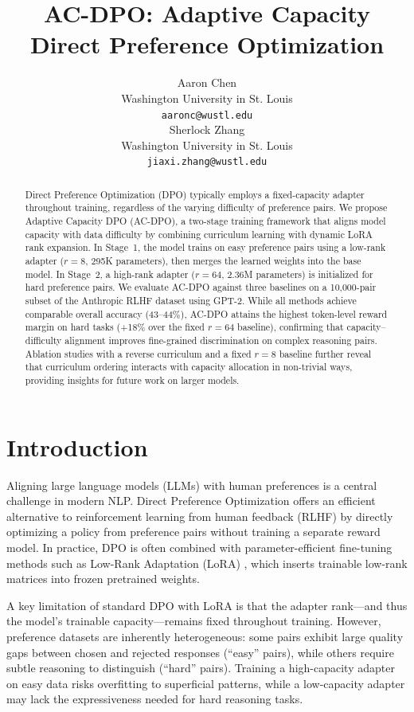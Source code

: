 \documentclass{article}
\title{AC-DPO: Adaptive Capacity Direct Preference Optimization}
\author{
  Aaron Chen \\
  Washington University in St. Louis \\
  \texttt{aaronc@wustl.edu} \\
  \And
  Sherlock Zhang \\
  Washington University in St. Louis \\
  \texttt{jiaxi.zhang@wustl.edu} \\
}
\begin{document}
\maketitle

\begin{abstract}
Direct Preference Optimization (DPO) typically employs a fixed-capacity adapter throughout training, regardless of the varying difficulty of preference pairs. We propose Adaptive Capacity DPO (AC-DPO), a two-stage training framework that aligns model capacity with data difficulty by combining curriculum learning with dynamic LoRA rank expansion. In Stage~1, the model trains on easy preference pairs using a low-rank adapter ($r{=}8$, 295K parameters), then merges the learned weights into the base model. In Stage~2, a high-rank adapter ($r{=}64$, 2.36M parameters) is initialized for hard preference pairs. We evaluate AC-DPO against three baselines on a 10,000-pair subset of the Anthropic RLHF dataset using GPT-2. While all methods achieve comparable overall accuracy (43--44\%), AC-DPO attains the highest token-level reward margin on hard tasks (+18\% over the fixed $r{=}64$ baseline), confirming that capacity--difficulty alignment improves fine-grained discrimination on complex reasoning pairs. Ablation studies with a reverse curriculum and a fixed $r{=}8$ baseline further reveal that curriculum ordering interacts with capacity allocation in non-trivial ways, providing insights for future work on larger models.
\end{abstract}

\section{Introduction}

Aligning large language models (LLMs) with human preferences is a central challenge in modern NLP. Direct Preference Optimization \citep{rafailov2023dpo} offers an efficient alternative to reinforcement learning from human feedback (RLHF) by directly optimizing a policy from preference pairs without training a separate reward model. In practice, DPO is often combined with parameter-efficient fine-tuning methods such as Low-Rank Adaptation (LoRA) \citep{hu2022lora}, which inserts trainable low-rank matrices into frozen pretrained weights.

A key limitation of standard DPO with LoRA is that the adapter rank---and thus the model's trainable capacity---remains fixed throughout training. However, preference datasets are inherently heterogeneous: some pairs exhibit large quality gaps between chosen and rejected responses (``easy'' pairs), while others require subtle reasoning to distinguish (``hard'' pairs). Training a high-capacity adapter on easy data risks overfitting to superficial patterns, while a low-capacity adapter may lack the expressiveness needed for hard reasoning tasks.
\end{document}
